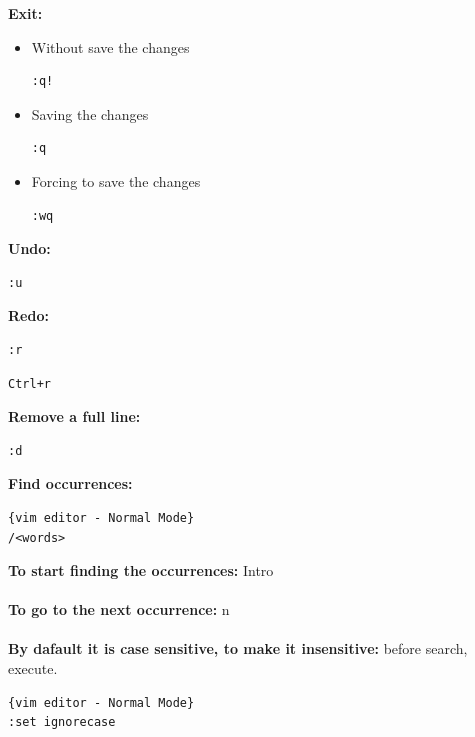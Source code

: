 \documentclass{article}
\newenvironment{codetemplate}[1][]{%
  \mybasecolorbox[#1]
  \itshape
}{%
  \endmybasecolorbox
}
\begin{document}
\textbf{Exit:}

\begin{itemize}
    \item Without save the changes
\begin{codetemplate}{}
\begin{verbatim}
:q!
\end{verbatim}
\end{codetemplate}
    \item Saving the changes
\begin{codetemplate}{}
\begin{verbatim}
:q
\end{verbatim}
\end{codetemplate}

    \item Forcing to save the changes
\begin{codetemplate}{}
\begin{verbatim}
:wq
\end{verbatim}
\end{codetemplate}
\end{itemize}


\textbf{Undo:}
\begin{codetemplate}{}
\begin{verbatim}
:u
\end{verbatim}
\end{codetemplate}

\textbf{Redo:}
\begin{codetemplate}{}
\begin{verbatim}
:r
\end{verbatim}
\end{codetemplate}
\begin{codetemplate}{}
\begin{verbatim}
Ctrl+r
\end{verbatim}
\end{codetemplate}

\textbf{Remove a full line:}
\begin{codetemplate}{}
\begin{verbatim}
:d
\end{verbatim}
\end{codetemplate}

\textbf{Find occurrences:}
\begin{codetemplate}
\begin{verbatim}{vim editor - Normal Mode}
/<words>
\end{verbatim}
\end{codetemplate}
\textbf{To start finding the occurrences:} Intro
\\\\
\textbf{To go to the next occurrence:} n
\\\\
\textbf{By dafault it is case sensitive, to make it insensitive:} before search, execute.
\begin{codetemplate}
\begin{verbatim}{vim editor - Normal Mode}
:set ignorecase
\end{verbatim}
\end{codetemplate}
\end{document}
